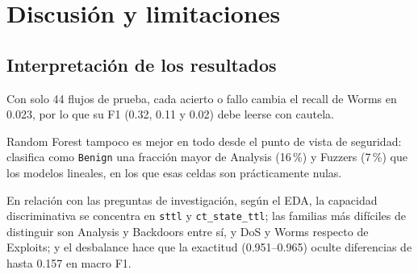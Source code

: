 \documentclass[conference]{IEEEtran}
\begin{document}
\section{Discusión y limitaciones}


\subsection{Interpretación de los resultados}

Con solo 44 flujos de prueba, cada acierto o fallo cambia el recall de Worms en 0.023, por lo que su F1 (0.32, 0.11 y 0.02) debe leerse con cautela.

Random Forest tampoco es mejor en todo desde el punto de vista de seguridad: clasifica como \texttt{Benign} una fracción mayor de Analysis (16\,\%) y Fuzzers (7\,\%) que los modelos lineales, en los que esas celdas son prácticamente nulas.

En relación con las preguntas de investigación, según el EDA, la capacidad discriminativa se concentra en \texttt{sttl} y \texttt{ct\_state\_ttl}; las familias más difíciles de distinguir son Analysis y Backdoors entre sí, y DoS y Worms respecto de Exploits; y el desbalance hace que la exactitud (0.951--0.965) oculte diferencias de hasta 0.157 en macro F1.
\end{document}
